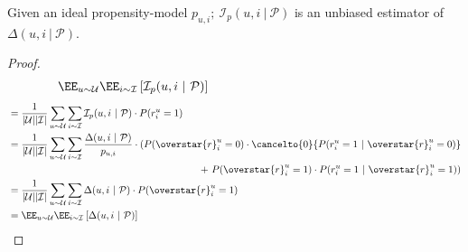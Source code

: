 \begin{proposition}
Given an ideal propensity-model $p_{u, i}; \ \mathcal{I}_p(u, i ~|~ \mathcal{P})$ is an unbiased estimator of $\Delta(u, i ~|~ \mathcal{P})$.
\end{proposition}

\begin{proof}
\begin{align*}
    \EE_{u \sim \mathcal{U}} \EE_{i \sim \mathcal{I}} \left[ \mathcal{I}_p(u, i ~|~ \mathcal{P}) \right] \hspace{5.65cm}
\end{align*}
\vspace{-0.4cm}
\begin{align*}
    &= \frac{1}{|\mathcal{U}| |\mathcal{I}|} \sum_{u \sim \mathcal{U}} \sum_{i \sim \mathcal{I}} \mathcal{I}_p(u, i ~|~ \mathcal{P}) \cdot P(r_i^u = 1) \\
    &= \begin{aligned}[t]
        \frac{1}{|\mathcal{U}| |\mathcal{I}|} \sum_{u \sim \mathcal{U}} \sum_{i \sim \mathcal{I}} \frac{\Delta(u, i ~|~ \mathcal{P})}{p_{u, i}} \cdot ( P(\overstar{r}_i^u = 0) \cdot \cancelto{0}{P(r_i^u = 1 ~|~ \overstar{r}_i^u = 0)} \\
        +~ P(\overstar{r}_i^u = 1) \cdot P(r_i^u = 1 ~|~ \overstar{r}_i^u = 1)) \\ %
    \end{aligned} \\
    &= \frac{1}{|\mathcal{U}| |\mathcal{I}|} \sum_{u \sim \mathcal{U}} \sum_{i \sim \mathcal{I}} \Delta(u, i ~|~ \mathcal{P}) \cdot P(\overstar{r}_i^u = 1) \\ %
    &= \EE_{u \sim \mathcal{U}} \EE_{i \sim \mathcal{I}} \left[ \Delta(u, i ~|~ \mathcal{P}) \right] \qedhere
\end{align*}
\end{proof}